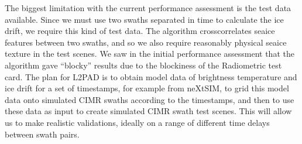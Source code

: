\documentclass[letterpaper,10pt,english]{jupyterBook}
\begin{document}
\sphinxAtStartPar
The biggest limitation with the current performance assessment is the test data available. Since we must use two swaths separated in time to calculate the ice drift, we require this kind of test data. The algorithm cross\sphinxhyphen{}correlates sea\sphinxhyphen{}ice features between two swaths, and so we also require reasonably physical sea\sphinxhyphen{}ice texture in the test scenes. We saw in the initial performance assessment that the algorithm gave “blocky” results due to the blockiness of the Radiometric test card. The plan for L2PAD is to obtain model data of brightness temperature and ice drift for a set of timestamps, for example from neXtSIM, to grid this model data onto simulated CIMR swaths according to the timestamps, and then to use these data as input to create simulated CIMR swath test scenes. This will allow us to make realistic validations, ideally on a range of different time delays between swath pairs.

\sphinxstepscope
\end{document}
